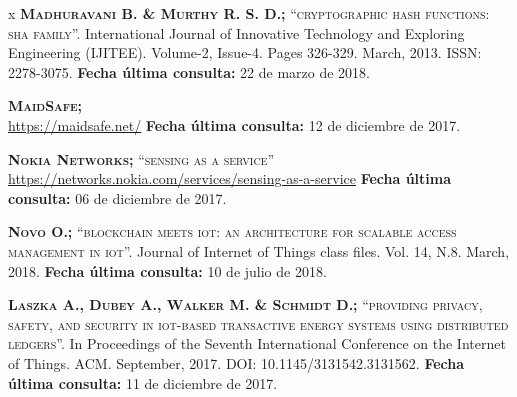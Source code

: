 \begin{thebibliography} {x}
	 \textsc{\textbf{Madhuravani B. \& Murthy R. S. D.; }}\textsc{“cryptographic hash functions: sha family”.} International Journal of Innovative Technology and Exploring Engineering (IJITEE). Volume-2, Issue-4. Pages 326-329. March, 2013. ISSN: 2278-3075.
	\newline \textbf{Fecha última consulta:} 22 de marzo de 2018.
	
	 \textsc{\textbf{MaidSafe; }} \\
	\url{https://maidsafe.net/}
	\newline \textbf{Fecha última consulta:} 12 de diciembre de 2017.
	
	 \textsc{\textbf{Nokia Networks; }}\textsc{“sensing as a service”} \\ 
	\url{https://networks.nokia.com/services/sensing-as-a-service}
	\newline \textbf{Fecha última consulta:} 06 de diciembre de 2017.
		
	 \textsc{\textbf{Novo O.; }} \textsc{“blockchain meets iot: an architecture for scalable access management in iot”.} Journal of Internet of Things class files. Vol. 14, N.8. March, 2018.	
	\newline \textbf{Fecha última consulta:} 10 de julio de 2018.
	
	 \textsc{\textbf{Laszka A., Dubey A., Walker M. \& Schmidt D.; }} \textsc{“providing privacy, safety, and security in iot-based transactive energy systems using distributed ledgers”.} In Proceedings of the Seventh International Conference on the Internet of Things. ACM. September, 2017. DOI: 10.1145/3131542.3131562.	
	\newline \textbf{Fecha última consulta:} 11 de diciembre de 2017.
		
		
	

\end{thebibliography}
